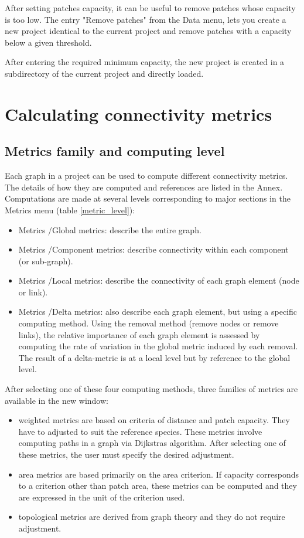 \documentclass{article}
\begin{document}
After setting patches capacity, it can be useful to remove patches whose capacity is too low. The entry "Remove patches" from the Data menu, lets you create a new project identical to the current project and remove patches with a capacity below a given threshold.

After entering the required minimum capacity, the new project is created in a subdirectory of the current project and directly loaded.


\section{Calculating connectivity metrics}

\subsection{Metrics family and computing level}
\label{metric_fam}
Each graph in a project can be used to compute different connectivity metrics. The details of how they are computed and references are listed in the Annex. Computations are made at several levels corresponding to major sections in the Metrics menu (table \ref{metric_level}):
\begin{itemize}
	\item Metrics /Global metrics: describe the entire graph.
	\item Metrics /Component metrics: describe connectivity within each component (or sub-graph).
	\item Metrics /Local metrics: describe the connectivity of each graph element (node or link).
	\item Metrics /Delta metrics: also describe each graph element, but using a specific computing method. Using the removal method (remove nodes or remove links), the relative importance of each graph element is assessed by computing the rate of variation in the global metric induced by each removal. The result of a delta-metric is at a local level but by reference to the global level.
\end{itemize}

After selecting one of these four computing methods, three families of
metrics are available in the new window: 
\begin{itemize}
	\item weighted metrics are based on criteria of distance and patch capacity. They have to adjusted to suit the reference species. These metrics involve computing paths in a graph via Dijkstra{\textquotesingle}s algorithm. After selecting one of these metrics, the user must specify the desired adjustment.
	\item area metrics are based primarily on the area criterion. If capacity corresponds to a criterion other than patch area, these metrics can be computed and they are expressed in the unit of the criterion used.
	\item topological metrics are derived from graph theory and they do not require adjustment.
\end{itemize}
\end{document}
